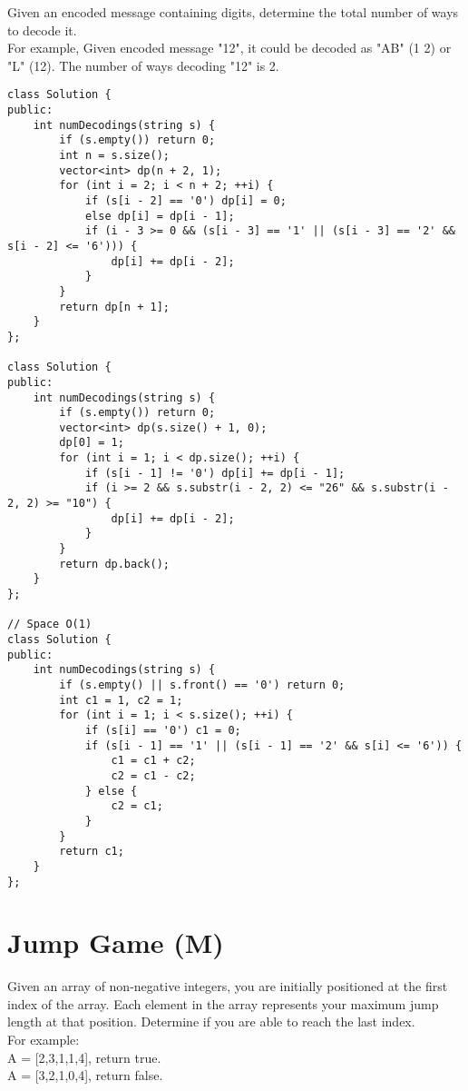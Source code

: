 Given an encoded message containing digits, determine the total number of ways to decode it.\\

For example,
Given encoded message "12", it could be decoded as "AB" (1 2) or "L" (12). The number of ways decoding "12" is 2. \\

\begin{lstlisting}
class Solution {
public:
    int numDecodings(string s) {
        if (s.empty()) return 0;
        int n = s.size();
        vector<int> dp(n + 2, 1);
        for (int i = 2; i < n + 2; ++i) {
            if (s[i - 2] == '0') dp[i] = 0;
            else dp[i] = dp[i - 1];
            if (i - 3 >= 0 && (s[i - 3] == '1' || (s[i - 3] == '2' && s[i - 2] <= '6'))) {
                dp[i] += dp[i - 2];
            }
        }
        return dp[n + 1];
    }
};

class Solution {
public:
    int numDecodings(string s) {
        if (s.empty()) return 0;
        vector<int> dp(s.size() + 1, 0);
        dp[0] = 1;
        for (int i = 1; i < dp.size(); ++i) {
            if (s[i - 1] != '0') dp[i] += dp[i - 1];
            if (i >= 2 && s.substr(i - 2, 2) <= "26" && s.substr(i - 2, 2) >= "10") {
                dp[i] += dp[i - 2];
            }
        }
        return dp.back();
    }
};

// Space O(1)
class Solution {
public:
    int numDecodings(string s) {
        if (s.empty() || s.front() == '0') return 0;
        int c1 = 1, c2 = 1;
        for (int i = 1; i < s.size(); ++i) {
            if (s[i] == '0') c1 = 0;
            if (s[i - 1] == '1' || (s[i - 1] == '2' && s[i] <= '6')) {
                c1 = c1 + c2;
                c2 = c1 - c2;
            } else {
                c2 = c1;
            }
        }
        return c1;
    }
};
\end{lstlisting}


\section{Jump Game (M)}
Given an array of non-negative integers, you are initially positioned at the first index of the array. Each element in the array represents your maximum jump length at that position. Determine if you are able to reach the last index.\\

For example:\\
A = [2,3,1,1,4], return true.\\
A = [3,2,1,0,4], return false. \\

